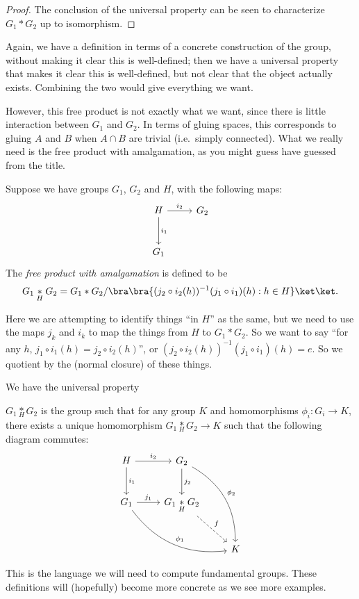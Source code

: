 \documentclass[a4paper]{article}
\begin{document}
\begin{proof}
  The conclusion of the universal property can be seen to characterize $G_1 * G_2$ up to isomorphism.
\end{proof}

Again, we have a definition in terms of a concrete construction of the group, without making it clear this is well-defined; then we have a universal property that makes it clear this is well-defined, but not clear that the object actually exists. Combining the two would give everything we want.

However, this free product is not exactly what we want, since there is little interaction between $G_1$ and $G_2$. In terms of gluing spaces, this corresponds to gluing $A$ and $B$ when $A \cap B$ are trivial (i.e.\ simply connected). What we really need is the free product with amalgamation, as you might guess have guessed from the title.

\begin{defi}
  Suppose we have groups $G_1$, $G_2$ and $H$, with the following maps:
  \[
    \begin{tikzcd}[row sep=large]
      H \ar[r, "i_2"] \ar[d, "i_1"] & G_2\\
      G_1
    \end{tikzcd}
  \]
  The \emph{free product with amalgamation} is defined to be
  \[
    G_1 \underset{H}{*} G_2 = G_1 * G_2/ \bra \bra \{(j_2 \circ i_2(h))^{-1} (j_1 \circ i_1)(h): h\in H\}\ket \ket.
  \]
\end{defi}
Here we are attempting to identify things ``in $H$'' as the same, but we need to use the maps $j_k$ and $i_k$ to map the things from $H$ to $G_1 * G_2$. So we want to say ``for any $h$, $j_1 \circ i_1 (h) = j_2 \circ i_2(h)$'', or $(j_2 \circ i_2(h))^{-1} (j_1 \circ i_1)(h) = e$. So we quotient by the (normal closure) of these things.

We have the universal property
\begin{lemma}
  $G_1 \underset{H}{*} G_2$ is the group such that for any group $K$ and homomorphisms $\phi_i: G_i \to K$, there exists a unique homomorphism $G_1 \underset{H}{*} G_2 \to K$ such that the following diagram commutes:
  \[
    \begin{tikzcd}[row sep=large]
      H \ar[r, "i_2"] \ar[d, "i_1"] & G_2 \ar[rdd, bend left, "\phi_2"] \ar[d, "j_2"]\\
      G_1 \ar[rrd, bend right, "\phi_1"] \ar [r, "j_1"] & G_1 \underset{H}{*} G_2 \ar [rd, dashed, "f"]\\
      && K
    \end{tikzcd}
  \]
\end{lemma}
This is the language we will need to compute fundamental groups. These definitions will (hopefully) become more concrete as we see more examples.
\end{document}
